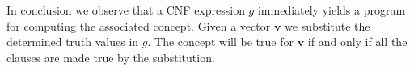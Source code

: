 In conclusion we observe that a CNF expression $g$ immediately yields
a program for computing the associated concept. Given a vector
$\mathbf{v}$ we substitute the determined truth values in $g$. The
concept will be true for $\mathbf{v}$ if and only if all the clauses
are made true by the substitution.
